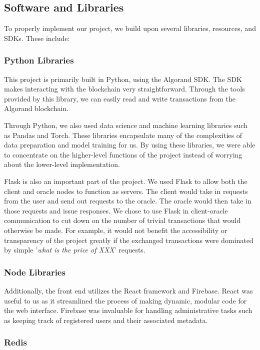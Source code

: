 \documentclass{ledger}
\begin{document}
\subsection{Software and Libraries}

To properly implement our project, we build upon several libraries, resources, and SDKs.  These include:

\subsubsection{Python Libraries}

This project is primarily built in Python, using the Algorand SDK.  The SDK makes interacting with the blockchain
very straightforward.  Through the tools provided by this library, we can easily read and write transactions from
the Algorand blockchain.

Through Python, we also used data science and machine learning libraries such as Pandas
and Torch.  These libraries encapsulate many of the complexities of data preparation and model training for us.
By using these libraries, we were able to concentrate on the higher-level functions of the project instead of worrying
about the lower-level implementation.

Flask is also an important part of the project.  We used Flask to allow both the client and oracle nodes to function as
servers.  The client would take in requests from the user and send out requests to the oracle.  The oracle would then
take in those requests and issue responses.  We chose to use Flask in client-oracle communication to cut down on the
number of trivial transactions that would otherwise be made.  For example, it would not benefit the accessibility or
transparency of the project greatly if the exchanged transactions were dominated by simple '\textit{what is the price of XXX}'
requests.

\subsubsection{Node Libraries}

Additionally, the front end utilizes the React framework and Firebase.  React was useful to us as it streamlined the
process of making dynamic, modular code for the web interface.  Firebase was invaluable for handling administrative
tasks such as keeping track of registered users and their associated metadata.

\subsubsection{Redis}
\end{document}
